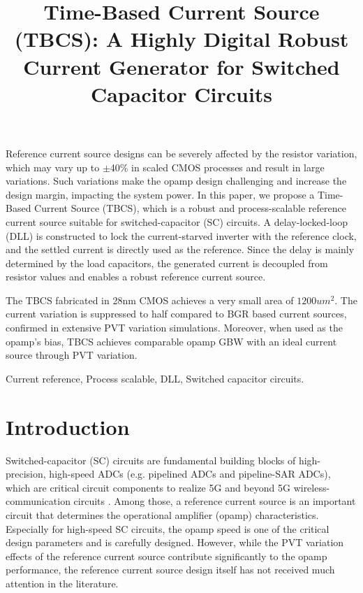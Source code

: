 \documentclass[paper]{ieice}
\title{\LARGE \bf
Time-Based Current Source (TBCS): A Highly Digital Robust Current Generator for Switched Capacitor Circuits
}
\begin{document}
\maketitle
\thispagestyle{empty}
\pagestyle{empty}

\begin{summary}
Reference current source designs can be severely affected by the resistor variation, which may vary up to $\pm$40\% in scaled CMOS processes and result in large variations. Such variations make the opamp design challenging and increase the design margin, impacting the system power.
In this paper, we propose a Time-Based Current Source (TBCS), which is a robust and process-scalable reference current source suitable for switched-capacitor (SC) circuits.
A delay-locked-loop (DLL) is constructed to lock the current-starved inverter with the reference clock, and the settled current is directly used as the reference.
Since the delay is mainly determined by the load capacitors, the generated current is decoupled from resistor values and enables a robust reference current source. 

The TBCS fabricated in 28nm CMOS achieves a very small area of $1200um^2$. The current variation is suppressed to half compared to BGR based current sources, confirmed in extensive PVT variation simulations. Moreover, when used as the opamp's bias, TBCS achieves comparable opamp GBW with an ideal current source through PVT variation.

\end{summary}
\begin{keywords}
Current reference, Process scalable, DLL, Switched capacitor circuits.
\end{keywords}

\section{Introduction}

Switched-capacitor (SC) circuits are fundamental building blocks of high-precision, high-speed ADCs (e.g. pipelined ADCs and pipeline-SAR ADCs), which are critical circuit components to realize 5G and beyond 5G wireless-communication circuits \cite{5g1, 5g2, ali201414, ali202012, lagos2018single, hung2020calibration}. Among those, a reference current source is an important circuit that determines the operational amplifier (opamp) characteristics. Especially for high-speed SC circuits, the opamp speed is one of the critical design parameters and is carefully designed. However, while the PVT variation effects of the reference current source contribute significantly to the opamp performance, the reference current source design itself has not received much attention in the literature.
\end{document}
